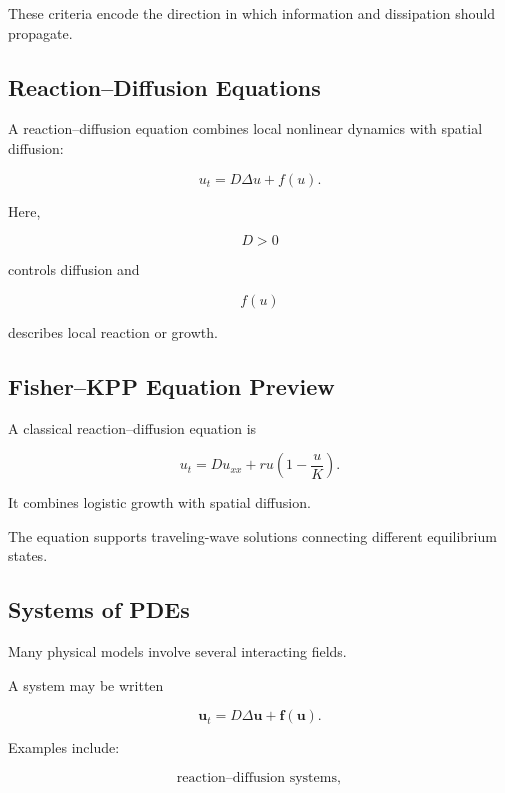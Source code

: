 These criteria encode the direction in which information and
dissipation should propagate.

\subsection{Reaction--Diffusion Equations}
\label{subsec:reaction-diffusion}

A reaction--diffusion equation combines local nonlinear dynamics with
spatial diffusion:

\[
\boxed{
u_t
=
D\Delta u
+
f(u).
}
\]

Here,

\[
D>0
\]

controls diffusion and

\[
f(u)
\]

describes local reaction or growth.

\subsection{Fisher--KPP Equation Preview}
\label{subsec:fisher-kpp-preview}

A classical reaction--diffusion equation is

\[
\boxed{
u_t
=
D u_{xx}
+
ru
\left(
1-\frac{u}{K}
\right).
}
\]

It combines logistic growth with spatial diffusion.

The equation supports traveling-wave solutions connecting different
equilibrium states.

\subsection{Systems of PDEs}
\label{subsec:systems-of-pdes}

Many physical models involve several interacting fields.

A system may be written

\[
\boxed{
\mathbf{u}_t
=
D\Delta\mathbf{u}
+
\mathbf{f}(\mathbf{u}).
}
\]

Examples include:

\[
\boxed{
\text{reaction--diffusion systems},
}
\]

